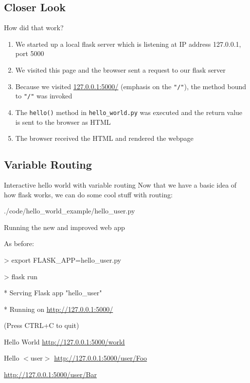 \documentclass{beamer}
\begin{document}
\subsection{Closer Look}
	\begin{frame}[t]{How did that work?}
		\begin{enumerate}
			\item{We started up a local flask server which is listening at
					IP address 127.0.0.1, port 5000}
			\pause
			\item{We visited this page and the browser sent a request to our
					flask server}
			\pause
			\item{Because we visited \url{127.0.0.1:5000/} (emphasis on the
					\texttt{"/"}), the method bound to \texttt{"/"} was invoked}
			\pause
			\item{The \texttt{hello()} method in \texttt{hello\_world.py} was
					executed and the return value is sent to the browser as
					HTML}
			\pause
			\item{The browser received the HTML and rendered the webpage}
		\end{enumerate}
	\end{frame}


\subsection{Variable Routing}
	\begin{frame}[t]{Interactive hello world with variable routing}
		Now that we have a basic idea of how flask works, we can do some cool
		stuff with routing:
		\begin{block}{./code/hello\_world\_example/hello\_user.py}
			
		\end{block}
	\end{frame}

	\begin{frame}[t]{Running the new and improved web app}
		\begin{block}{As before:}
			\begin{semiverbatim}
				> export FLASK\_APP=hello\_user.py

				> flask run

				* Serving Flask app "hello\_user"

				* Running on \url{http://127.0.0.1:5000/}

					(Press CTRL+C to quit)
			\end{semiverbatim}
		\end{block}
		\pause

		\begin{block}{Hello World}
			\url{http://127.0.0.1:5000/world}
		\end{block}

		\begin{block}{Hello $<$user$>$}
			\url{http://127.0.0.1:5000/user/Foo}

			\url{http://127.0.0.1:5000/user/Bar}
		\end{block}
	\end{frame}
\end{document}
